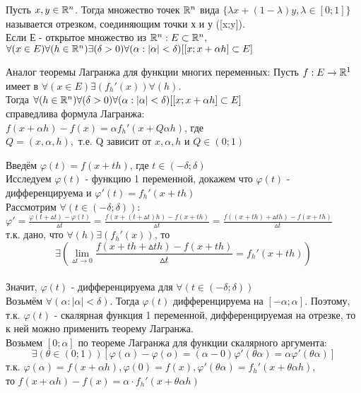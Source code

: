\begin{opred}
Пусть $x,y\in\mathbb{R}^n$. Тогда множество точек $\mathbb{R}^n$ вида $\{\lambda x+(1-\lambda)y, \lambda\in[0;1]\}$ называется отрезком, соединяющим точки х и у ([x;y]).
\\
Если Е - открытое множество из $\mathbb{R}^n:E\subset\mathbb{R}^n,$
\\
$\forall(x\in E)\forall(h\in\mathbb{R}^n)\exists(\delta > 0)\forall(\alpha:|\alpha| < \delta)[[x;x+\alpha h]\subset E]$
\end{opred}

\begin{teorema}
Аналог теоремы Лагранжа для функции многих переменных:
Пусть $f:E\to\mathbb{R}^1$ имеет в $\forall(x\in E)\exists(f_h'(x))\forall(h).$
\\
Тогда $\forall(h\in\mathbb{R}^n)\forall(\delta > 0)\forall(\alpha:|\alpha| < \delta)[[x;x+\alpha h]\subset E]$
\\
справедлива формула Лагранжа:
\\
$f(x+\alpha h)-f(x)=\alpha f_h'(x+Q\alpha h)$, где
\\
$Q=(x,\alpha,h),$ т.е. Q зависит от $x,\alpha,h$ и $Q\in (0;1)$
\end{teorema}
\dokvo
Введём $\varphi(t)=f(x+th)$, где $t\in(-\delta;\delta)$
\\
Исследуем $\varphi(t)$ - функцию 1 переменной, докажем что $\varphi(t)$ - дифференцируема и $\varphi '(t) = f_h'(x+th)$
\\
Рассмотрим $\forall(t\in(-\delta;\delta)):$
\\
$\varphi ' = \frac{\varphi(t+\vartriangle t)-\varphi(t)}{\vartriangle t} = \frac{f(x+(t+\vartriangle t)h)-f(x+th)}{\vartriangle t}=\frac{f((x+th)+\vartriangle th)-f(x+th)}{\vartriangle t}$
\\
т.к. дано, что $\forall(h)\exists(f_h'(x))$, то 
$$
\exists(\lim_{\vartriangle t\to 0}\frac{f(x+th+\vartriangle th)-f(x+th)}{\vartriangle t}=f_h'(x+th))
$$
\dokno
\\
Значит, $\varphi (t)$ - дифференцируема для $\forall(t\in(-\delta;\delta))$
\\
Возьмём $\forall(\alpha:|\alpha|<\delta).$ Тогда $\varphi(t)$ дифференцируема на $[-\alpha;\alpha]$. Поэтому, т.к. $\varphi (t)$ - скалярная функция 1 переменной, дифференцируемая на отрезке, то к ней можно применить теорему Лагранжа.
\\
Возьмем $[0;\alpha]$ по теореме Лагранжа для функции скалярного аргумента:
$$
\exists(\theta\in(0;1))[\varphi(\alpha)-\varphi(o)=(\alpha - 0)\varphi'(\theta\alpha)=\alpha\varphi'(\theta\alpha)]
$$ 
т.к. $\varphi(\alpha)=f(x+\alpha h), \varphi (0) = f(x), \varphi'(\theta\alpha)=f_h'(x+\theta\alpha h),$
\\
то $f(x+\alpha h) - f(x) = \alpha\cdot f_h'(x+\theta\alpha h)$
\dokno







